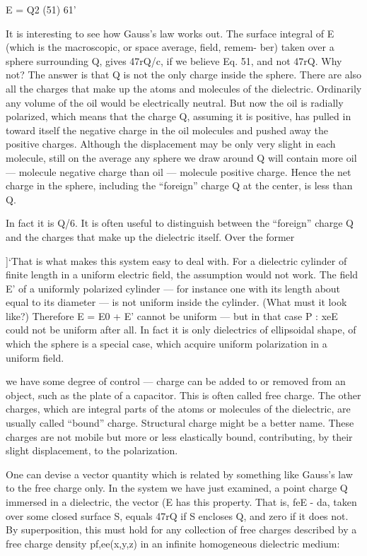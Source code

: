 {{{\begin{equation}
\end{equation}
E = Q2 (51)
61'

It is interesting to see how Gauss's law works out. The surface integral
of E (which is the macroscopic, or space average, field, remem-
ber) taken over a sphere surrounding Q, gives 47rQ/c, if we believe
Eq. 51, and not 47rQ. Why not? The answer is that Q is not the only
charge inside the sphere. There are also all the charges that make up
the atoms and molecules of the dielectric. Ordinarily any volume
of the oil would be electrically neutral. But now the oil is radially
polarized, which means that the charge Q, assuming it is positive, has
pulled in toward itself the negative charge in the oil molecules and
pushed away the positive charges. Although the displacement may
be only very slight in each molecule, still on the average any sphere
we draw around Q will contain more oil --- molecule negative charge
than oil --- molecule positive charge. Hence the net charge in the
sphere, including the ``foreign'' charge Q at the center, is less than Q.

In fact it is Q/6.
It is often useful to distinguish between the ``foreign'' charge Q
and the charges that make up the dielectric itself. Over the former

]‘That is what makes this system easy to deal with. For a dielectric cylinder of
finite length in a uniform electric field, the assumption would not work. The field E'
of a uniformly polarized cylinder --- for instance one with its length about equal to its
diameter --- is not uniform inside the cylinder. (What must it look like?) Therefore
E = E0 + E' cannot be uniform --- but in that case P : xeE could not be uniform after
all. In fact it is only dielectrics of ellipsoidal shape, of which the sphere is a special
case, which acquire uniform polarization in a uniform field.

we have some degree of control --- charge can be added to or removed
from an object, such as the plate of a capacitor. This is often called
free charge. The other charges, which are integral parts of the atoms
or molecules of the dielectric, are usually called ``bound'' charge.
Structural charge might be a better name. These charges are not
mobile but more or less elastically bound, contributing, by their
slight displacement, to the polarization.

One can devise a vector quantity which is related by something
like Gauss's law to the free charge only. In the system we have just
examined, a point charge Q immersed in a dielectric, the vector (E
has this property. That is, feE - da, taken over some closed surface S,
equals 47rQ if S encloses Q, and zero if it does not. By superposition,
this must hold for any collection of free charges described by a free
charge density pf,ee(x,y,z) in an infinite homogeneous dielectric
medium:

}}}
